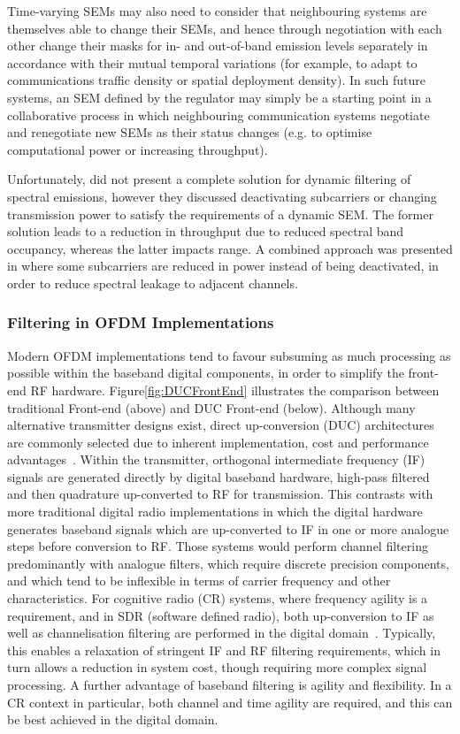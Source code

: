 Time-varying SEMs may also need to consider that neighbouring systems are themselves able to change their SEMs, and hence through negotiation with each other change their masks for in- and out-of-band emission levels separately in accordance with their mutual temporal variations (for example, to adapt to communications traffic density or spatial deployment density).
In such future systems, an SEM defined by the regulator may simply be a starting point in a collaborative process in which neighbouring communication systems negotiate and renegotiate new SEMs as their status changes (e.g. to optimise computational power or increasing throughput).

Unfortunately, \cite{Forde2010} did not present a complete solution for dynamic filtering of spectral emissions, however they discussed deactivating subcarriers or changing transmission power to satisfy the requirements of a dynamic SEM.
The former solution leads to a reduction in throughput due to reduced spectral band occupancy, whereas the latter impacts range.
A combined approach was presented in \cite{Kryszkiewicz2013} where some subcarriers are reduced in power instead of being deactivated, in order to reduce spectral leakage to adjacent channels.

\subsubsection{Filtering in OFDM Implementations}
\label{sec:how_ofdm_works}

Modern OFDM implementations tend to favour subsuming as much processing as possible within the baseband digital components, in order to simplify the front-end RF hardware.
Figure\ref{fig:DUCFrontEnd} illustrates the comparison between traditional Front-end (above) and DUC Front-end (below).
Although many alternative transmitter designs exist, direct up-conversion (DUC) architectures are commonly selected due to inherent implementation, cost and performance advantages~\cite{masse2006direct}.
Within the transmitter, orthogonal intermediate frequency (IF) signals are generated directly by digital baseband hardware, high-pass filtered and then quadrature up-converted to RF for transmission.
This contrasts with more traditional digital radio implementations in which the digital hardware generates baseband signals which are up-converted to IF in one or more analogue steps before conversion to RF.
Those systems would perform channel filtering predominantly with analogue filters, which require discrete precision components, and which tend to be inflexible in terms of carrier frequency and other characteristics.
For cognitive radio (CR) systems, where frequency agility is a requirement, and in SDR (software defined radio), both up-conversion to IF as well as channelisation filtering are performed in the digital domain~\cite{Chen2005,Dowle2006}.
Typically, this enables a relaxation of stringent IF and RF filtering requirements, which in turn allows a reduction in system cost, though requiring more complex signal processing.
A further advantage of baseband filtering is agility and flexibility.
In a CR context in particular, both channel and time agility are required, and this can be best achieved in the digital domain.

